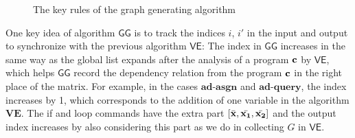 {\begin{figure}
    \vspace{-0.4cm}
    \caption{The key rules of the graph generating algorithm}
    \label{fig:algo_ad}
    \vspace{-0.5cm}
\end{figure}
}
%

One key idea of algorithm $\mathsf{GG}$ is to track the indices $i$, $i'$ in the input and output to synchronize with the previous algorithm $\mathsf{VE}$: The index in $\mathsf{GG}$ increases in the same way as the global list expands after the analysis of a program ${\bf{{c}}}$ by $\mathsf{VE}$, which helps $\mathsf{GG}$ record the dependency relation from the program ${\bf{{c}}}$ in the right place of the matrix. For example, in the cases $\textbf{ad-asgn}$ and $\textbf{ad-query}$, the index increases by 1, which corresponds to the addition of one variable in the algorithm $\textbf{VE}$. The if and loop commands have the extra part $[\bar{{\bf{{x}}}}, \bar{{\bf{{x_1}}}}, \bar{{\bf{{x_2}}}}] $ and the output index increases by also considering this part as we do in collecting $G$ in $\mathsf{VE}$.  

